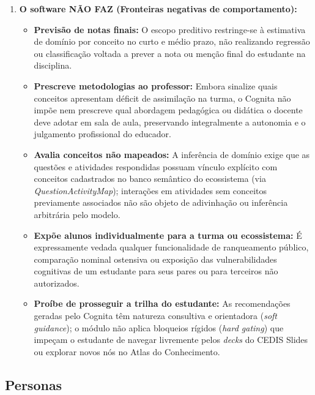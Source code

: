 \begin{enumerate}
    \item \textbf{O software NÃO FAZ (Fronteiras negativas de comportamento):}
    \begin{itemize}
        \item \textbf{Previsão de notas finais:} O escopo preditivo restringe-se à estimativa de domínio por conceito no curto e médio prazo, não realizando regressão ou classificação voltada a prever a nota ou menção final do estudante na disciplina.
        \item \textbf{Prescreve metodologias ao professor:} Embora sinalize quais conceitos apresentam déficit de assimilação na turma, o Cognita não impõe nem prescreve qual abordagem pedagógica ou didática o docente deve adotar em sala de aula, preservando integralmente a autonomia e o julgamento profissional do educador.
        \item \textbf{Avalia conceitos não mapeados:} A inferência de domínio exige que as questões e atividades respondidas possuam vínculo explícito com conceitos cadastrados no banco semântico do ecossistema (via \textit{QuestionActivityMap}); interações em atividades sem conceitos previamente associados não são objeto de adivinhação ou inferência arbitrária pelo modelo.
        \item \textbf{Expõe alunos individualmente para a turma ou ecossistema:} É expressamente vedada qualquer funcionalidade de ranqueamento público, comparação nominal ostensiva ou exposição das vulnerabilidades cognitivas de um estudante para seus pares ou para terceiros não autorizados.
        \item \textbf{Proíbe de prosseguir a trilha do estudante:} As recomendações geradas pelo Cognita têm natureza consultiva e orientadora (\textit{soft guidance}); o módulo não aplica bloqueios rígidos (\textit{hard gating}) que impeçam o estudante de navegar livremente pelos \textit{decks} do CEDIS Slides ou explorar novos nós no Atlas do Conhecimento.
    \end{itemize}
\end{enumerate}

\subsection{Personas}
\label{subsec:personas}

